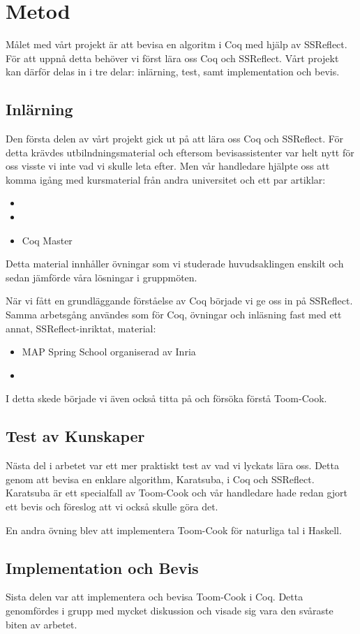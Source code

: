 \section{Metod}
Målet med vårt projekt är att bevisa en algoritm i Coq med hjälp av SSReflect.
För att uppnå detta behöver vi först lära oss Coq och SSReflect. Vårt projekt
kan därför delas in i tre delar: inlärning, test, samt implementation och
bevis.

\subsection{Inlärning}
Den första delen av vårt projekt gick ut på att lära oss Coq och SSReflect. För
detta krävdes utbilndningsmaterial och eftersom bevisassistenter var helt nytt
för oss visste vi inte vad vi skulle leta efter. Men vår handledare hjälpte oss
att komma igång med kursmaterial från andra universitet och ett par artiklar:
\begin{itemize}
  \item {}
  \item {}
  \item Coq Master
\end{itemize}
Detta material innhåller övningar som vi studerade huvudsaklingen enskilt och
sedan jämförde våra lösningar i gruppmöten.

När vi fått en grundläggande förståelse av Coq började vi ge oss in på
SSReflect. Samma arbetsgång användes som för Coq, övningar och inläsning fast
med ett annat, SSReflect-inriktat, material:
\begin{itemize}
  \item MAP Spring School organiserad av Inria
  \item {}
\end{itemize}
I detta skede började vi även också titta på och försöka förstå Toom-Cook.

\subsection{Test av Kunskaper}
Nästa del i arbetet var ett mer praktiskt test av vad vi lyckats lära oss.
Detta genom att bevisa en enklare algorithm, Karatsuba, i Coq och SSReflect.
Karatsuba är ett specialfall av Toom-Cook och vår handledare hade redan gjort
ett bevis och föreslog att vi också skulle göra det.

En andra övning blev att implementera Toom-Cook för naturliga tal i Haskell.

\subsection{Implementation och Bevis}
Sista delen var att implementera och bevisa Toom-Cook i Coq. Detta genomfördes
i grupp med mycket diskussion och visade sig vara den svåraste biten av arbetet.
